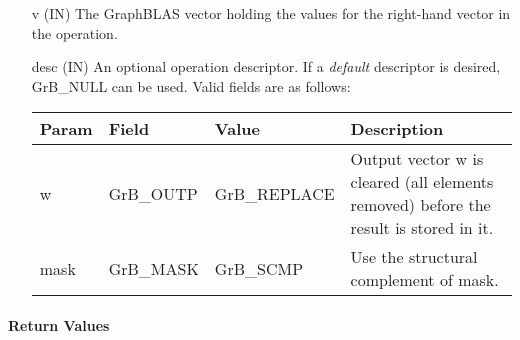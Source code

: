 \begin{itemize}[leftmargin=1.1in]
    \item[{\sf v}]     ({\sf IN}) The GraphBLAS vector holding the values for
    the right-hand vector in the operation.

    \item[{\sf desc}]  ({\sf IN}) An optional operation descriptor.  If a \emph{default}
    descriptor is desired, {\sf GrB\_NULL} can be used.  Valid fields are
    as follows: \\
    
    \begin{tabular}{lllp{2.5in}}
        Param & Field  & Value & Description \\
        \hline
        {\sf w}    & {\sf GrB\_OUTP} & {\sf GrB\_REPLACE} & Output vector {\sf w}
        is cleared (all elements removed) before the result is stored in it. \\
        
        {\sf mask} & {\sf GrB\_MASK} & {\sf GrB\_SCMP}   & Use the structural 
        complement of {\sf mask}. \\
    \end{tabular}
\end{itemize}

\paragraph{Return Values}

